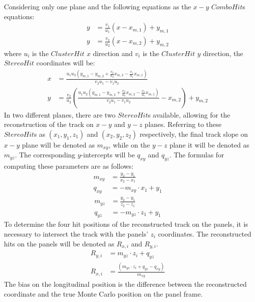 Considering only one plane and the following 
equations as the $x-y$ $ComboHit$s equations:
\begin{equation}
    \begin{aligned}
        y&=\frac{v_1}{u_1}(x-x_{m,1})+y_{m,1} \\
        y&=\frac{v_2}{u_2}(x-x_{m,2})+y_{m,2} 
    \end{aligned}
    \end{equation}
where $u_i$ is the $ClusterHit$ $x$ direction and $v_i$ is the $ClusterHit$ $y$ direction, the $StereoHit$ coordinates will be:
\begin{equation}\label{x}
    \begin{aligned}
x&=\frac{u_1 u_2(y_{m,1}-y_{m,2}+\frac{v_2}{u_2}x_{m,2}-\frac{v_1}{u_1}x_{m,1})}{v_2 u_1 - v_1 u_2}\\
y&=\frac{v_2}{u_2}\left(\frac{u_1 u_2(y_{m,1}-y_{m,2}+\frac{v_2}{u_2}x_{m,2}-\frac{v_1}{u_1}x_{m,1})}{v_2 u_1 - v_1 u_2}-x_{m,2}\right)+y_{m,2}
\end{aligned}
\end{equation}
In two different planes, there are two $StereoHit$s available, allowing for the reconstruction of the track on $x-y$ and $y-z$ planes. 
Referring to these $StereoHit$s as $(x_1,y_1,z_1)$ and $(x_2,y_2,z_2)$ respectively, the final track slope on $x-y$ plane will be 
denoted as $m_{xy}$, while on the $y-z$ plane it will be denoted as $m_{yz}$. The corresponding $y$-intercepts will be $q_{xy}$ and $q_{yz}$.
The formulas for computing these parameters are as follows:
\begin{equation}
    \begin{aligned}
m_{xy}&=\frac{y_2-y_1}{x_2-x_1}\\
q_{xy}&=-m_{xy} \cdot x_1+y_1
\end{aligned}
\end{equation}
\begin{equation}
    \begin{aligned}
m_{yz}&=\frac{y_2-y_1}{z_2-z_1}\\
q_{yz}&=-m_{yz} \cdot z_1+y_1
\end{aligned}
\end{equation}
To determine the four hit positions of the reconstructed track on the panels, it is necessary to intersect the track with the panels' $z_i$ coordinates. 
The reconstructed hits on the panels will be denoted as $R_{x,i}$ and $R_{y,i}$.
\begin{equation}
    \begin{aligned}
 R_{y,i}&=m_{yz}\cdot z_i+q_{yz}\\
 R_{x,i}&=\frac{(m_{yz}\cdot z_i+q_{yz}-q_{xy})}{m_{xy}}
\end{aligned}
\end{equation}
The bias on the longitudinal position is the difference between 
the reconstructed coordinate and the true Monte Carlo position 
on the panel frame.

